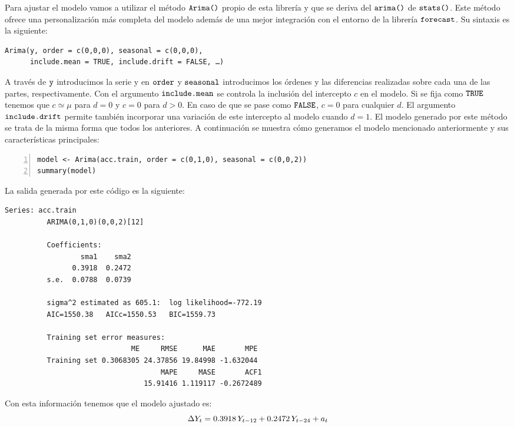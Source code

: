 Para ajustar el modelo vamos a utilizar el método $\verb!Arima()!$ propio de esta librería y que se deriva del $\verb!arima()!$ de $\verb!stats()!$. Este método ofrece una personalización más completa del modelo además de una mejor integración con el entorno de la librería $\verb!forecast!$. Su sintaxis es la siguiente:
\begin{Verbatim}[fontsize=\footnotesize]
Arima(y, order = c(0,0,0), seasonal = c(0,0,0),
      include.mean = TRUE, include.drift = FALSE, …)
\end{Verbatim}

A través de $\verb!y!$ introducimos la serie y en $\verb!order!$ y $\verb!seasonal!$ introducimos los órdenes y las diferencias realizadas sobre cada una de las partes, respectivamente. Con el argumento $\verb!include.mean!$ se controla la inclusión del intercepto $c$ en el modelo. Si se fija como $\verb!TRUE!$ tenemos que $c \simeq \mu$ para $d = 0$ y $c = 0$ para $d > 0$. En caso de que se pase como $\verb!FALSE!$, $c = 0$ para cualquier $d$. El argumento $\verb!include.drift!$ permite también incorporar una variación de este intercepto al modelo cuando $d = 1$. El modelo generado por este método se trata de la misma forma que todos los anteriores. A continuación se muestra cómo generamos el modelo mencionado anteriormente y sus características principales:
\begin{Verbatim}[fontsize=\footnotesize, numbers = left]
model <- Arima(acc.train, order = c(0,1,0), seasonal = c(0,0,2))
summary(model)
\end{Verbatim}

La salida generada por este código es la siguiente:
\begin{Verbatim}[fontsize=\footnotesize]
          Series: acc.train
          ARIMA(0,1,0)(0,0,2)[12]

          Coefficients:
                  sma1    sma2
                0.3918  0.2472
          s.e.  0.0788  0.0739

          sigma^2 estimated as 605.1:  log likelihood=-772.19
          AIC=1550.38   AICc=1550.53   BIC=1559.73

          Training set error measures:
                              ME     RMSE      MAE       MPE
          Training set 0.3068305 24.37856 19.84998 -1.632044
                                     MAPE     MASE       ACF1
                                 15.91416 1.119117 -0.2672489
\end{Verbatim}

Con esta información tenemos que el modelo ajustado es:
\begin{equation}
    \Delta Y_t = 0.3918 \thinspace Y_{t-12} + 0.2472 \thinspace Y_{t-24} + a_t
\end{equation}

